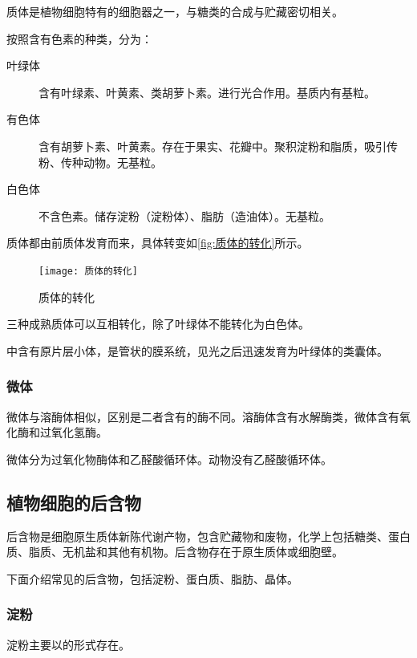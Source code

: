 	质体是植物细胞特有的细胞器之一，与糖类的合成与贮藏密切相关。
	
	按照含有色素的种类，分为：
	\begin{description}
		\item[叶绿体] 含有叶绿素、叶黄素、类胡萝卜素。进行光合作用。基质内有基粒。
		\item[有色体] 含有胡萝卜素、叶黄素。存在于果实、花瓣中。聚积淀粉和脂质，吸引传粉、传种动物。无基粒。
		\item[白色体] 不含色素。储存淀粉（淀粉体）、脂肪（造油体）。无基粒。
	\end{description}
	
	
	质体都由前质体发育而来，具体转变如\autoref{fig:质体的转化}所示。
	
	\begin{figure}[htbp]
		\centering
		\texttt{[image: 质体的转化]}
		\caption{质体的转化}
		\label{fig:质体的转化}
	\end{figure}
	
	三种成熟质体可以互相转化，除了叶绿体不能转化为白色体。
	
	中含有原片层小体，是管状的膜系统，见光之后迅速发育为叶绿体的类囊体。
	
	\subsubsection{微体}
	
	微体与溶酶体相似，区别是二者含有的酶不同。溶酶体含有水解酶类，微体含有氧化酶和过氧化氢酶。
	
	微体分为过氧化物酶体和乙醛酸循环体。动物没有乙醛酸循环体。
	
	\subsection{植物细胞的后含物}

	 后含物是细胞原生质体新陈代谢产物，包含贮藏物和废物，化学上包括糖类、蛋白质、脂质、无机盐和其他有机物。后含物存在于原生质体或细胞壁。
	 
	 下面介绍常见的后含物，包括淀粉、蛋白质、脂肪、晶体。
	 
	 \subsubsection{淀粉}
	 
	 淀粉主要以的形式存在。
	 
